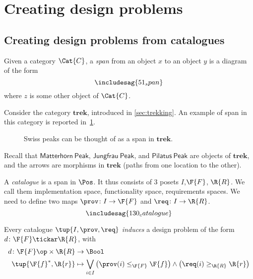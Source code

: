 \section{Creating design problems}
\subsection{Creating design problems from catalogues}
\begin{shaded}
\begin{definition}[Span]
Given a category $\Cat{C}$, a \emph{span} from an object $x$ to an object $y$ is a diagram of the form
\begin{equation}
\includesag{51_span}
\end{equation}
where $z$ is some other object of $\Cat{C}$. 
\end{definition}
\end{shaded}
\begin{example}
Consider the category $\mathbf{trek}$, introduced in \cref{sec:trekking}. An example of span in this category is reported in~\cref{fig:exmountains}.
\begin{figure}[h!]
\begin{center}
\end{center}
\caption{Swiss peaks can be thought of as a span in $\mathbf{trek}$. \label{fig:exmountains}}
\end{figure}
Recall that $\mathsf{Matterhorn \ Peak}$, $\mathsf{Jungfrau \ Peak}$, and $\mathsf{Pilatus \ Peak}$ are objects of $\mathbf{trek}$, and the arrows are morphisms in $\mathbf{trek}$ (paths from one location to the other).
\end{example}

\begin{definition}[Catalogue] \label{def:catalogue}
A \emph{catalogue} is a span in $\Pos$.
It thus consists of 3 posets $I$,$\F{F}$, $\R{R}$.
We call them implementation space, functionality space, requirements spaces. We need to define two maps $\prov \colon I \to \F{F}$
and $\req\colon I \to \R{R}$.
\begin{equation}
\includesag{130_catalogue}
\end{equation}
\end{definition}

\begin{definition}
Every catalogue $\tup{I,\prov,\req}$ \emph{induces} a design problem of the form $d\colon \F{F}\tickar \R{R}$, with
\begin{equation}
    \begin{aligned}
    d\colon \F{F}\op \times \R{R}&\to \Bool\\
    \tup{\F{f}^*,\R{r}}&\mapsto \bigvee_{i\in I}\left(\prov(i)\leq_{\F{F}}\F{f} \right)\wedge \left( \req(i)\geq_{\R{R}}\R{r}\right)
    \end{aligned}
\end{equation}
\end{definition}

